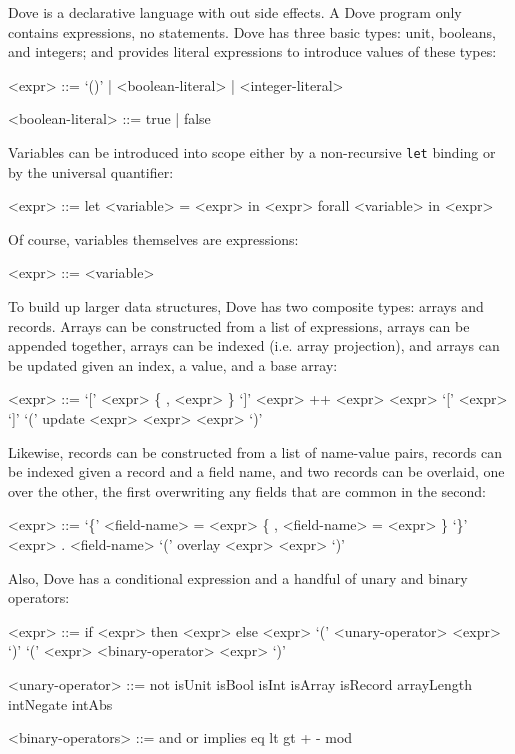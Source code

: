 \documentclass{article}
\begin{document}
Dove is a declarative language with out side effects.  A Dove
program only contains expressions, no statements.
Dove has three basic types: unit, booleans, and integers;
and provides literal expressions to introduce values
of these types:
\setlength{\grammarindent}{10em}
\begin{grammar}
  <expr> ::= `()' | <boolean-literal> | <integer-literal>

  <boolean-literal> ::= true | false
\end{grammar}

Variables can be introduced into scope either by a non-recursive \texttt{let}
binding or by the universal quantifier:

\begin{grammar}
  <expr> ::= let <variable> = <expr> in <expr>
    \alt forall <variable> in <expr>
\end{grammar}

Of course, variables themselves are expressions:

\begin{grammar}
  <expr> ::= <variable>
\end{grammar}

To build up larger data structures, Dove has two composite types: arrays and records.
Arrays can be constructed from a list of expressions, arrays can be appended
together, arrays can be indexed (i.e. array projection), and arrays can be 
updated given an index, a value, and a base array:

\begin{grammar}
  <expr> ::= `[' <expr> \{ , <expr> \} `]'
    \alt <expr> ++ <expr>
    \alt <expr> `[' <expr> `]'
    \alt `(' update <expr> <expr> <expr> `)'
\end{grammar}

Likewise, records can be constructed from a list of name-value pairs,
records can be indexed given a record and a field name, and two
records can be overlaid, one over the other, the first overwriting
any fields that are common in the second:

\begin{grammar}
  <expr> ::= `\{' <field-name> = <expr> \{ , <field-name> = <expr> \} `\}'
    \alt <expr> . <field-name>
    \alt `(' overlay <expr> <expr> `)'
\end{grammar}

Also, Dove has a conditional expression and a handful of unary and binary operators:

\begin{grammar}
  <expr> ::= if <expr> then <expr> else <expr>
    \alt `(' <unary-operator> <expr> `)'
    \alt `(' <expr> <binary-operator> <expr> `)'

  <unary-operator> ::= not
    \alt isUnit
    \alt isBool
    \alt isInt
    \alt isArray
    \alt isRecord
    \alt arrayLength
    \alt intNegate 
    \alt intAbs

  <binary-operators> ::= and
    \alt or
    \alt implies
    \alt eq
    \alt lt
    \alt gt
    \alt +
    \alt -
    \alt *
    \alt mod
\end{grammar}
\end{document}
